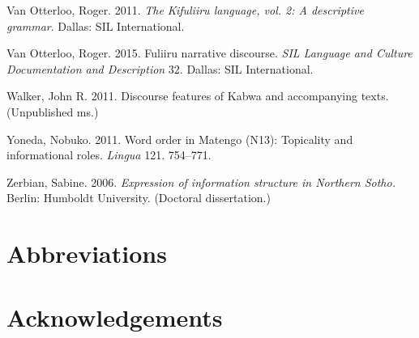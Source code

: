 \documentclass[output=paper]{langsci/langscibook}
\begin{document}
Van Otterloo, Roger. 2011. \textit{The Kifuliiru language, vol. 2: A descriptive grammar}. Dallas: SIL International.

Van Otterloo, Roger. 2015. Fuliiru narrative discourse. \textit{SIL Language and Culture Documentation and Descriptio}\textit{n }32. Dallas: SIL International.

Walker, John R. 2011. Discourse features of Kabwa and accompanying texts. (Unpublished ms.)

Yoneda, Nobuko. 2011. Word order in Matengo (N13): Topicality and informational roles. \textit{Lingua} 121. 754–771.

Zerbian, Sabine. 2006. \textit{Expression of information structure in Northern Sotho.} Berlin: Humboldt University. (Doctoral dissertation.)



\section*{Abbreviations}
\section*{Acknowledgements}

{\sloppy
\printbibliography[heading=subbibliography,notkeyword=this]
}
\end{document}
